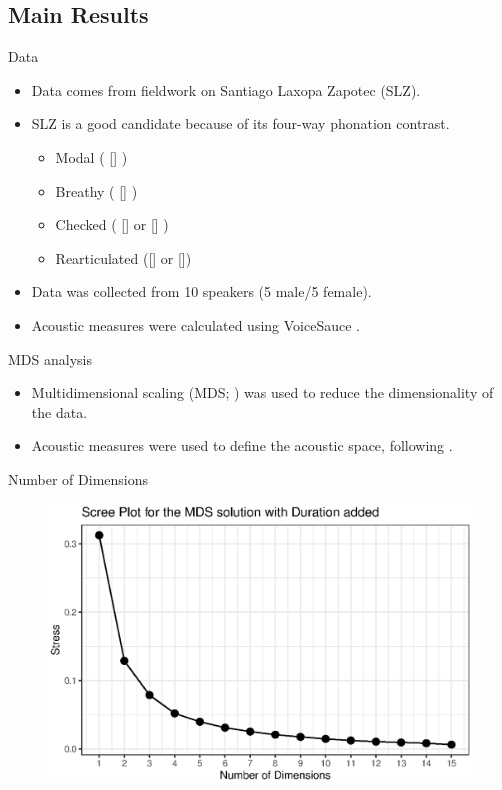 \documentclass{beamer}
\begin{document}
\subsection{Main Results}
\begin{frame}{Data}
  \begin{itemize}
    \item Data comes from fieldwork on Santiago Laxopa Zapotec (SLZ).
    \item SLZ is a good candidate because of its four-way phonation contrast.
    \begin{itemize}
      \item Modal ( [] )
      \item Breathy ( [] )
      \item Checked ( [] or [] )
      \item Rearticulated ([] or [])
    \end{itemize}
    \item Data was collected from 10 speakers (5 male/5 female).
    \item Acoustic measures were calculated using VoiceSauce \citep{shueVoiceSauceProgramVoice2011}.
  \end{itemize}
\end{frame}

\begin{frame}{MDS analysis}
  \begin{itemize}
    \item Multidimensional scaling (MDS; \cite{kruskalMultidimensionalScaling1978}) was used to reduce the dimensionality of the data.
    \item Acoustic measures were used to define the acoustic space, following \citet{keatingCrosslanguageAcousticSpace2023}.
  \end{itemize}
\end{frame}

\begin{frame}{Number of Dimensions}
  \begin{figure}[h!]
    \centering
    \includegraphics[width = 0.8\linewidth]{images/MDS/stress_plot_dur.eps}
\end{figure}
\end{frame}
\end{document}
